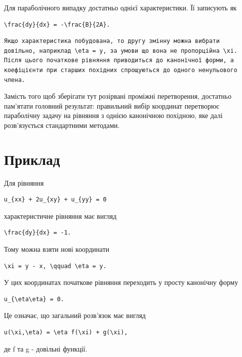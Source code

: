 \documentclass[
  ukrainian,
]{article}
\begin{document}
Для параболічного випадку достатньо однієї характеристики. Її записують
як

\begin{verbatim}
\frac{dy}{dx} = -\frac{B}{2A}.
\end{verbatim}

\begin{verbatim}
Якщо характеристика побудована, то другу змінну можна вибрати довільно, наприклад \eta = y, за умови що вона не пропорційна \xi. Після цього початкове рівняння приводиться до канонічної форми, а коефіцієнти при старших похідних спрощуються до одного ненульового члена.
\end{verbatim}

Замість того щоб зберігати тут розірвані проміжні перетворення,
достатньо пам'ятати головний результат: правильний вибір координат
перетворює параболічну задачу на рівняння з однією канонічною похідною,
яке далі розв'язується стандартними методами.

\section{Приклад}\label{ux43fux440ux438ux43aux43bux430ux434}

Для рівняння

\begin{verbatim}
u_{xx} + 2u_{xy} + u_{yy} = 0
\end{verbatim}

характеристичне рівняння має вигляд

\begin{verbatim}
\frac{dy}{dx} = -1.
\end{verbatim}

Тому можна взяти нові координати

\begin{verbatim}
\xi = y - x, \qquad \eta = y.
\end{verbatim}

У цих координатах початкове рівняння переходить у просту канонічну форму

\begin{verbatim}
u_{\eta\eta} = 0.
\end{verbatim}

Це означає, що загальний розв'язок має вигляд

\begin{verbatim}
u(\xi,\eta) = \eta f(\xi) + g(\xi),
\end{verbatim}

де f та g - довільні функції.
\end{document}
